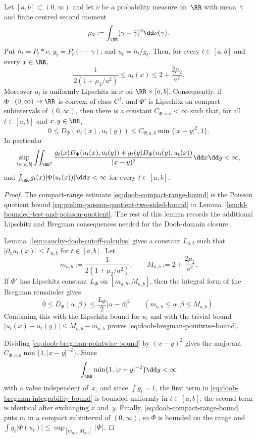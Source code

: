 \begin{lemma}%
\label{lem:doob-range-bregman-integrability}
Let $[a,b]\subset(0,\infty)$ and let $\nu$ be a probability measure
on~$\RR$ with mean~$\bar{\gamma}$ and finite centred second moment
\[
\mu_2:=\int_{\RR}(\gamma-\bar{\gamma})^2\dd\nu(\gamma).
\]
Put $h_t=P_t*\nu$, $g_t=P_t(\cdot-\bar{\gamma})$, and
$u_t=h_t/g_t$.  Then, for every $t\in[a,b]$ and every $x\in\RR$,
\begin{equation}\label{eq:doob-compact-range-bound}
\frac{1}{2(1+\mu_2/a^2)}
\le u_t(x)\le
2+\frac{2\mu_2}{a^2}.
\end{equation}
Moreover $u_t$ is uniformly Lipschitz in $x$ on
$\RR\times[a,b]$.  Consequently, if
$\Phi:(0,\infty)\to\RR$ is convex, of class $C^1$, and $\Phi'$ is
Lipschitz on compact subintervals of $(0,\infty)$, then there is a
constant $C_{\Phi,a,b}<\infty$ such that, for all $t\in[a,b]$ and
$x,y\in\RR$,
\begin{equation}\label{eq:doob-bregman-pointwise-bound}
0\le D_\Phi(u_t(x),u_t(y))
\le C_{\Phi,a,b}\min\{|x-y|^2,1\}.
\end{equation}
In particular
\begin{equation}\label{eq:doob-bregman-integrability-bound}
\sup_{t\in[a,b]}
\iint_{\RR^2}
\frac{
g_t(x)D_\Phi(u_t(x),u_t(y))
+g_t(y)D_\Phi(u_t(y),u_t(x))}
{(x-y)^2}\dd x\dd y<\infty,
\end{equation}
and $\int_{\RR}g_t(x)|\Phi(u_t(x))|\dd x<\infty$ for every
$t\in[a,b]$.
\end{lemma}

\begin{proof}
The compact-range estimate \eqref{eq:doob-compact-range-bound} is the
Poisson quotient bound \eqref{eq:prelim-poisson-quotient-two-sided-bound} in
Lemma~\ref{lem:kl-bounded-test-and-poisson-quotient}.  The rest of this
lemma records the additional Lipschitz and Bregman consequences needed for
the Doob-domain closure.

Lemma~\ref{lem:cauchy-doob-cutoff-calculus} gives a constant
$L_{a,b}$ such that $|\partial_xu_t(x)|\le L_{a,b}$ for
$t\in[a,b]$.  Let
\[
m_{a,b}:=\frac{1}{2(1+\mu_2/a^2)},
\qquad
M_{a,b}:=2+\frac{2\mu_2}{a^2}.
\]
If $\Phi'$ has Lipschitz constant $L_\Phi$ on
$[m_{a,b},M_{a,b}]$, then the integral form of the Bregman remainder gives
\[
0\le D_\Phi(\alpha,\beta)\le \frac{L_\Phi}{2}|\alpha-\beta|^2
\qquad(m_{a,b}\le\alpha,\beta\le M_{a,b}).
\]
Combining this with the Lipschitz bound for $u_t$ and with the trivial
bound $|u_t(x)-u_t(y)|\le M_{a,b}-m_{a,b}$ proves
\eqref{eq:doob-bregman-pointwise-bound}.

Dividing \eqref{eq:doob-bregman-pointwise-bound} by $(x-y)^2$ gives the
majorant $C_{\Phi,a,b}\min\{1,|x-y|^{-2}\}$.  Since
\[
\int_{\RR}\min\{1,|x-y|^{-2}\}\dd y<\infty
\]
with a value independent of~$x$, and since $\int g_t=1$, the first term
in \eqref{eq:doob-bregman-integrability-bound} is bounded uniformly in
$t\in[a,b]$; the second term is identical after exchanging $x$ and~$y$.
Finally, \eqref{eq:doob-compact-range-bound} puts $u_t$ in a compact
subinterval of $(0,\infty)$, so $\Phi$ is bounded on the range and
$\int g_t|\Phi(u_t)|\le\sup_{[m_{a,b},M_{a,b}]}|\Phi|$.
\end{proof}


